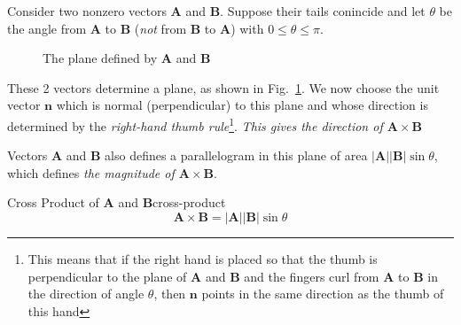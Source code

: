 Consider two nonzero vectors $\boldsymbol{A}$ and $\boldsymbol{B}$. Suppose their tails conincide and let $\theta$ be
the angle from $\boldsymbol{A}$ to $\boldsymbol{B}$ (\textit{not} from $\boldsymbol{B}$ to $\boldsymbol{A}$) with
$0 \le \theta \le \pi$.

\begin{figure}[H]
    \centering
    \caption{The plane defined by $\boldsymbol{A}$ and $\boldsymbol{B}$}
    \label{fig:cross-prod}
\end{figure}

These 2 vectors determine a plane, as shown in Fig.~\ref{fig:cross-prod}. We now choose the unit
vector $\boldsymbol{n}$ which is normal (perpendicular) to this plane and whose direction is determined by the
\textit{right-hand thumb rule}\footnote{This means that if the right hand is placed so that the thumb is perpendicular
to the plane of $\boldsymbol{A}$ and $\boldsymbol{B}$ and the fingers curl from $\boldsymbol{A}$ to $\boldsymbol{B}$ in
the direction of angle $\theta$, then $\boldsymbol{n}$ points in the same direction as the thumb of this hand}.
\textit{This gives the direction of $\boldsymbol{A} \times \boldsymbol{B}$}

Vectors $\boldsymbol{A}$ and $\boldsymbol{B}$ also defines a parallelogram in this plane of area
$\vert \boldsymbol{A} \vert\vert \boldsymbol{B} \vert\sin{\theta}$, which defines \textit{the magnitude of
$\boldsymbol{A} \times \boldsymbol{B}$}.

\begin{Definition}{Cross Product of $\boldsymbol{A}$ and $\boldsymbol{B}$}{cross-product}
    \begin{equation}
        \boldsymbol{A} \times \boldsymbol{B} = \vert \boldsymbol{A} \vert\vert \boldsymbol{B} \vert\sin{\theta}
    \end{equation}
\end{Definition}

